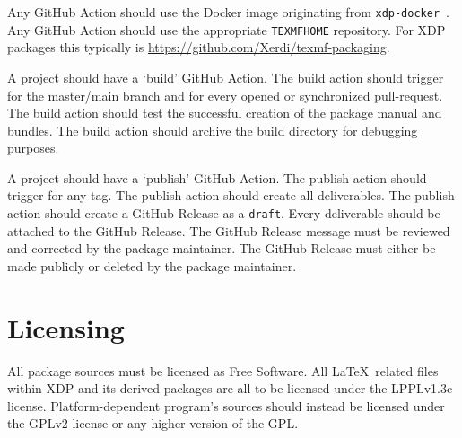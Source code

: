 \documentclass{xdpdoc}
\begin{document}
    Any GitHub Action should use the Docker image originating from \texttt{xdp-docker}~\cite{xdp-docker}.
    Any GitHub Action should use the appropriate \texttt{TEXMFHOME} repository.
    For XDP packages this typically is \url{https://github.com/Xerdi/texmf-packaging}.

    A project should have a `build' GitHub Action.
    The build action should trigger for the master/main branch and for every opened or synchronized pull-request.
    The build action should test the successful creation of the package manual and bundles.
    The build action should archive the build directory for debugging purposes.

    A project should have a `publish' GitHub Action.
    The publish action should trigger for any tag.
    The publish action should create all deliverables.
    The publish action should create a GitHub Release as a \texttt{draft}.
    Every deliverable should be attached to the GitHub Release.
    The GitHub Release message must be reviewed and corrected by the package maintainer.
    The GitHub Release must either be made publicly or deleted by the package maintainer.

    \section{Licensing}

    All package sources must be licensed as Free Software.
    All \LaTeX\ related files within XDP and its derived packages are all to be licensed under the LPPLv1.3c license.
    Platform-dependent program's sources should instead be licensed under the GPLv2 license or any higher version of the GPL\@.

    \printbibliography
\end{document}
